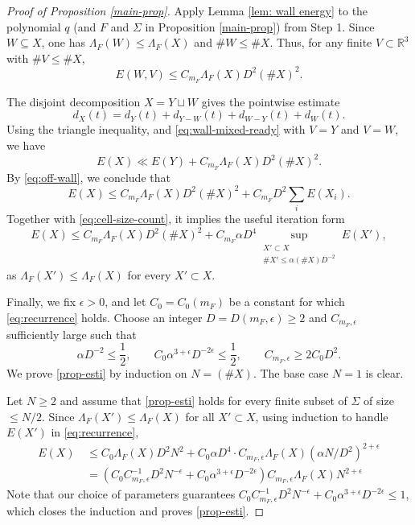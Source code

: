 \documentclass{amsart}%
\numberwithin{equation}{section}
\newcommand{\e}{\epsilon}
\newcommand{\ZR}{\mathbb{R}}
\newcommand{\1}{\mathbbm{1}}
\begin{document}
\begin{proof}[Proof of Proposition \ref{main-prop}]
\medskip



Apply Lemma \ref{lem: wall energy} to the polynomial $q$ (and $F$ and $\Sigma$ in Proposition \ref{main-prop}) from Step 1.
Since $W\subseteq X$, one has $\Lambda_{F}(W)\leq\Lambda_F(X)$ and $\#W\leq \# X$.
Thus, for any finite $V\subset \ZR^3$ with $\#V\leq \#X$, 
\begin{equation}
\label{eq:wall-mixed-ready}
    E(W,V)\leq C_{m_F}\Lambda_{F}(X)D^2(\#X)^2.
\end{equation}

The disjoint decomposition $X=Y\sqcup W$ gives the pointwise estimate
\begin{equation}
\nonumber
    d_X(t)=d_Y(t)+d_{Y-W}(t)+d_{W-Y}(t)+d_W(t).
\end{equation}
Using the triangle inequality, and \eqref{eq:wall-mixed-ready} with $V=Y$ and $V=W$, we have
\begin{equation}
\nonumber
    E(X)\ll E(Y)+C_{m_F}\Lambda_F(X)D^2(\#X)^2.
\end{equation}
By \eqref{eq:off-wall}, we conclude that
\begin{equation}
\nonumber
    E(X)\leq C_{m_F}\Lambda_F(X)D^2(\#X)^2+C_{m_F}D^2\sum_iE(X_i).
\end{equation}
Together with \eqref{eq:cell-size-count}, it implies the useful iteration
form
\begin{equation}
\label{eq:recurrence}
    E(X)\leq C_{m_F}\Lambda_F(X) D^2(\#X)^2+C_{m_F}\alpha D^4 \sup_{\substack{X'\subset X\\ \#X'\leq\alpha (\#X)D^{-2}}}E(X'),
\end{equation}
as $\Lambda_{F}(X')\leq\Lambda_F(X)$ for every $X'\subset X$.

\medskip  



Finally, we fix $\e>0$, and let $C_0=C_0(m_F)$ be a constant for which
\eqref{eq:recurrence} holds.  
Choose an integer $D=D(m_F,\e)\geq2$ and $C_{m_F,\e}$ sufficiently large such that
\begin{equation}
\nonumber
    \alpha D^{-2}\leq \frac{1}{2}, \qquad C_0\alpha^{3+\e}D^{-2\e}\leq\frac12,\qquad C_{m_F,\e}\geq2C_0D^2.
\end{equation}
We prove \eqref{prop-esti} by induction on $N=(\#X)$.  
The base case $N=1$ is clear.

Let $N\geq2$ and assume that \eqref{prop-esti} holds for every finite subset of $\Sigma$ of size $\leq N/2$. 
Since $\Lambda_{F}(X')\leq\Lambda_F(X)$ for all $X'\subset X$, using induction to handle $E(X')$ in \eqref{eq:recurrence}, 
\begin{align}
\nonumber
    E(X)\,&\leq C_0\Lambda_F(X) D^2N^2+C_0\alpha D^4\cdot C_{m_F,\e}\Lambda_F(X)(\alpha N/D^2)^{2+\e}\\ \nonumber
    &=(C_0C_{m_F,\e}^{-1}D^{2}N^{-\e}+C_0\alpha^{3+\e}D^{-2\e}) C_{m_F,\e}\Lambda_F(X)N^{2+\e}
\end{align}
Note that our choice of parameters guarantees  $C_0C_{m_F,\e}^{-1}D^{2}N^{-\e}+C_0\alpha^{3+\e}D^{-2\e}\leq1$, which closes the induction and proves \eqref{prop-esti}.
\qedhere



\end{proof}
\end{document}
